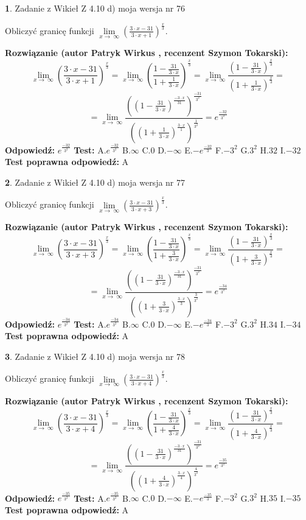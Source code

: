 \documentclass[12pt, a4paper]{article}
\theoremstyle{definition} %
\newtheorem{zad}{}
\newcommand{\zadStart}[1]{\begin{zad}#1\newline}
\newcommand{\zadStop}{\end{zad}}
\newcommand{\rozwStart}[2]{\noindent \textbf{Rozwiązanie (autor #1 , recenzent #2): }\newline}
\newcommand{\rozwStop}{\newline}
\newcommand{\odpStart}{\noindent \textbf{Odpowiedź:}\newline}
\newcommand{\odpStop}{\newline}
\newcommand{\testStart}{\noindent \textbf{Test:}\newline}
\newcommand{\testStop}{\newline}
\newcommand{\kluczStart}{\noindent \textbf{Test poprawna odpowiedź:}\newline}
\newcommand{\kluczStop}{\newline}
\begin{document}
\zadStart{Zadanie z Wikieł Z 4.10 d) moja wersja nr 76}


Obliczyć granicę funkcji  $\lim\limits_{x\to\ \infty}(\frac{3\cdot x-31}{3\cdot x+1})^{\frac{x}{3}}$.
\zadStop
\rozwStart{Patryk Wirkus}{Szymon Tokarski}
$$\lim\limits_{x\to\ \infty}(\frac{3\cdot x-31}{3\cdot x+1})^{\frac{x}{3}} = \lim\limits_{x\to\ \infty}(\frac{1-\frac{31}{3\cdot x}}{1+\frac{1}{3\cdot x}})^{\frac{x}{3}}=\lim\limits_{x\to\ \infty}\frac{(1-\frac{31}{3\cdot x})^{\frac{x}{3}}}{(1+\frac{1}{3\cdot x})^{\frac{x}{3}}}=$$
$$=\lim\limits_{x\to\ \infty}\frac{((1-\frac{31}{3\cdot x})^{\frac{-3\cdot x}{31}})^{\frac{-31}{3^{2}}}}{((1+\frac{1}{3\cdot x})^{\frac{3\cdot x}{1}})^{\frac{1}{3^{2}}}}=e^{\frac{-32}{3^{2}}}$$
\rozwStop
\odpStart
$e^{\frac{-32}{3^{2}}}$
\odpStop
\testStart
A.$e^{\frac{-32}{3^{2}}}$ B.$\infty$ C.$0$ D.$-\infty$ E.$-e^{\frac{-32}{3}}$
F.$-3^{2}$ G.$3^{2}$
H.$32$
I.$-32$
\testStop
\kluczStart
A
\kluczStop



\zadStart{Zadanie z Wikieł Z 4.10 d) moja wersja nr 77}


Obliczyć granicę funkcji  $\lim\limits_{x\to\ \infty}(\frac{3\cdot x-31}{3\cdot x+3})^{\frac{x}{3}}$.
\zadStop
\rozwStart{Patryk Wirkus}{Szymon Tokarski}
$$\lim\limits_{x\to\ \infty}(\frac{3\cdot x-31}{3\cdot x+3})^{\frac{x}{3}} = \lim\limits_{x\to\ \infty}(\frac{1-\frac{31}{3\cdot x}}{1+\frac{3}{3\cdot x}})^{\frac{x}{3}}=\lim\limits_{x\to\ \infty}\frac{(1-\frac{31}{3\cdot x})^{\frac{x}{3}}}{(1+\frac{3}{3\cdot x})^{\frac{x}{3}}}=$$
$$=\lim\limits_{x\to\ \infty}\frac{((1-\frac{31}{3\cdot x})^{\frac{-3\cdot x}{31}})^{\frac{-31}{3^{2}}}}{((1+\frac{3}{3\cdot x})^{\frac{3\cdot x}{3}})^{\frac{3}{3^{2}}}}=e^{\frac{-34}{3^{2}}}$$
\rozwStop
\odpStart
$e^{\frac{-34}{3^{2}}}$
\odpStop
\testStart
A.$e^{\frac{-34}{3^{2}}}$ B.$\infty$ C.$0$ D.$-\infty$ E.$-e^{\frac{-34}{3}}$
F.$-3^{2}$ G.$3^{2}$
H.$34$
I.$-34$
\testStop
\kluczStart
A
\kluczStop



\zadStart{Zadanie z Wikieł Z 4.10 d) moja wersja nr 78}


Obliczyć granicę funkcji  $\lim\limits_{x\to\ \infty}(\frac{3\cdot x-31}{3\cdot x+4})^{\frac{x}{3}}$.
\zadStop
\rozwStart{Patryk Wirkus}{Szymon Tokarski}
$$\lim\limits_{x\to\ \infty}(\frac{3\cdot x-31}{3\cdot x+4})^{\frac{x}{3}} = \lim\limits_{x\to\ \infty}(\frac{1-\frac{31}{3\cdot x}}{1+\frac{4}{3\cdot x}})^{\frac{x}{3}}=\lim\limits_{x\to\ \infty}\frac{(1-\frac{31}{3\cdot x})^{\frac{x}{3}}}{(1+\frac{4}{3\cdot x})^{\frac{x}{3}}}=$$
$$=\lim\limits_{x\to\ \infty}\frac{((1-\frac{31}{3\cdot x})^{\frac{-3\cdot x}{31}})^{\frac{-31}{3^{2}}}}{((1+\frac{4}{3\cdot x})^{\frac{3\cdot x}{4}})^{\frac{4}{3^{2}}}}=e^{\frac{-35}{3^{2}}}$$
\rozwStop
\odpStart
$e^{\frac{-35}{3^{2}}}$
\odpStop
\testStart
A.$e^{\frac{-35}{3^{2}}}$ B.$\infty$ C.$0$ D.$-\infty$ E.$-e^{\frac{-35}{3}}$
F.$-3^{2}$ G.$3^{2}$
H.$35$
I.$-35$
\testStop
\kluczStart
A
\kluczStop
\end{document}
